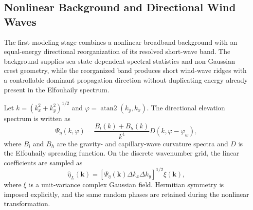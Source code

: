 \subsection{Nonlinear Background and Directional Wind Waves}
\label{subsec:nonlinear_directional_surface}

The first modeling stage combines a nonlinear broadband background with an equal-energy directional reorganization of its resolved short-wave band. The background supplies sea-state-dependent spectral statistics and non-Gaussian crest geometry, while the reorganized band produces short wind-wave ridges with a controllable dominant propagation direction without duplicating energy already present in the Elfouhaily spectrum.

Let $k=(k_x^2+k_y^2)^{1/2}$ and $\varphi=\operatorname{atan2}(k_y,k_x)$. The directional elevation spectrum is written as~\cite{elfouhaily1997unified}
\begin{equation}
\Psi_{\eta}(k,\varphi)=\frac{B_l(k)+B_h(k)}{k^4}D(k,\varphi-\varphi_w),
\label{eq:elfouhaily_2d}
\end{equation}
where $B_l$ and $B_h$ are the gravity- and capillary-wave curvature spectra and $D$ is the Elfouhaily spreading function. On the discrete wavenumber grid, the linear coefficients are sampled as
\begin{equation}
\widehat{\eta}_L(\boldsymbol{k})=\left[\Psi_{\eta}(\boldsymbol{k})\Delta k_x\Delta k_y\right]^{1/2}\xi(\boldsymbol{k}),
\label{eq:linear_spectral_sampling}
\end{equation}
where $\xi$ is a unit-variance complex Gaussian field. Hermitian symmetry is imposed explicitly, and the same random phases are retained during the nonlinear transformation.

